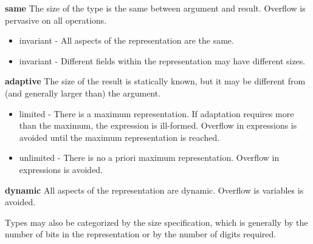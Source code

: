 \textbf{same}
The size of the type is the same between argument and result. Overflow is pervasive on all operations.
\begin{itemize}
\item invariant - All aspects of the representation are the same.
\item invariant - Different fields within the representation may have different sizes.
\end{itemize}
\textbf{adaptive}
The size of the result is statically known, but it may be different from (and generally larger than) the argument.
\begin{itemize}
\item limited - There is a maximum representation. If adaptation requires more than the maximum, the expression is ill-formed. Overflow in expressions is avoided until the maximum representation is reached.
\item unlimited - There is no a priori maximum representation. Overflow in expressions is avoided.
\end{itemize}
\textbf{dynamic}
All aspects of the representation are dynamic. Overflow is variables is avoided.

Types may also be categorized by the size specification, which is generally by the number of bits in the representation or by the number of digits required.

